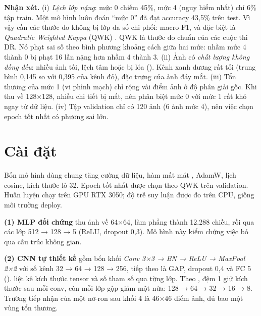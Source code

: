 \textbf{Nhận xét.} (i) \emph{Lệch lớp nặng}: mức 0 chiếm 45\%, mức 4 (nguy hiểm nhất) chỉ 6\% tập train. Một mô hình luôn đoán ``mức 0'' đã đạt accuracy 43,5\% trên test. Vì vậy cần các thước đo không bị lớp đa số chi phối: macro-F1, và đặc biệt là \emph{Quadratic Weighted Kappa} (QWK) \cite{cohen1968}. QWK là thước đo chuẩn của các cuộc thi DR. Nó phạt sai số theo bình phương khoảng cách giữa hai mức: nhầm mức 4 thành 0 bị phạt 16 lần nặng hơn nhầm 4 thành 3. (ii) Ảnh có \emph{chất lượng không đồng đều}: nhiều ảnh tối, lệch tâm hoặc bị lóa (). Kênh xanh dương rất tối (trung bình 0,145 so với 0,395 của kênh đỏ), đặc trưng của ảnh đáy mắt. (iii) Tổn thương của mức 1 (vi phình mạch) chỉ rộng vài điểm ảnh ở độ phân giải gốc. Khi thu về 128×128, nhiều chi tiết bị mất, nên phân biệt mức 0 với mức 1 rất khó ngay từ dữ liệu. (iv) Tập validation chỉ có 120 ảnh (6 ảnh mức 4), nên việc chọn epoch tốt nhất có phương sai lớn.

\section{Cài đặt}

Bốn mô hình dùng chung tăng cường dữ liệu, hàm mất mát , AdamW, lịch cosine, kích thước lô 32. Epoch tốt nhất được chọn theo QWK trên validation. Huấn luyện chạy trên GPU RTX 3050; độ trễ suy luận được đo trên CPU, giống môi trường deploy.

\textbf{(1) MLP đối chứng} thu ảnh về 64×64, làm phẳng thành 12.288 chiều, rồi qua các lớp 512 → 128 → 5 (ReLU, dropout 0,3). Mô hình này kiểm chứng việc bỏ qua cấu trúc không gian.

\textbf{(2) CNN tự thiết kế} gồm bốn khối \emph{Conv 3×3 → BN → ReLU → MaxPool 2×2} với số kênh 32 → 64 → 128 → 256, tiếp theo là GAP, dropout 0,4 và FC 5 ().  liệt kê kích thước tensor và số tham số qua từng lớp. Theo , đệm 1 giữ kích thước sau mỗi conv, còn mỗi lớp gộp giảm một nửa: 128 → 64 → 32 → 16 → 8. Trường tiếp nhận của một nơ-ron sau khối 4 là 46×46 điểm ảnh, đủ bao một vùng tổn thương.

